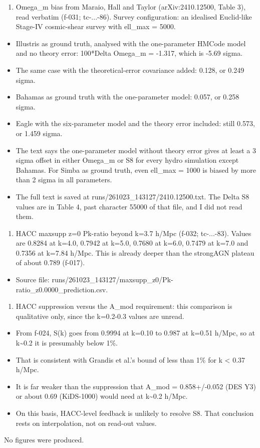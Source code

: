\documentclass[11pt,a4paper]{article}
\begin{document}
\begin{enumerate}
  \item Omega\_m bias from Maraio, Hall and Taylor (arXiv:2410.12500, Table 3), read verbatim (f-031; tc-...-86). Survey configuration: an idealised Euclid-like Stage-IV cosmic-shear survey with ell\_max = 5000.
\end{enumerate}
\begin{itemize}
  \item Illustris as ground truth, analysed with the one-parameter HMCode model and no theory error: 100*Delta Omega\_m = -1.317, which is -5.69 sigma.
  \item The same case with the theoretical-error covariance added: 0.128, or 0.249 sigma.
  \item Bahamas as ground truth with the one-parameter model: 0.057, or 0.258 sigma.
  \item Eagle with the six-parameter model and the theory error included: still 0.573, or 1.459 sigma.
  \item The text says the one-parameter model without theory error gives at least a 3 sigma offset in either Omega\_m or S8 for every hydro simulation except Bahamas. For Simba as ground truth, even ell\_max = 1000 is biased by more than 2 sigma in all parameters.
  \item The full text is saved at runs/261023\_143127/2410.12500.txt. The Delta S8 values are in Table 4, past character 55000 of that file, and I did not read them.
\end{itemize}
\begin{enumerate}
  \item HACC maxsupp z=0 Pk-ratio beyond k=3.7 h/Mpc (f-032; tc-...-83). Values are 0.8284 at k=4.0, 0.7942 at k=5.0, 0.7680 at k=6.0, 0.7479 at k=7.0 and 0.7356 at k=7.84 h/Mpc. This is already deeper than the strongAGN plateau of about 0.789 (f-017).
\end{enumerate}
\begin{itemize}
  \item Source file: runs/261023\_143127/maxsupp\_z0/Pk-ratio\_z0.0000\_prediction.csv.
\end{itemize}
\begin{enumerate}
  \item HACC suppression versus the A\_mod requirement: this comparison is qualitative only, since the k=0.2-0.3 values are unread.
\end{enumerate}
\begin{itemize}
  \item From f-024, S(k) goes from 0.9994 at k=0.10 to 0.987 at k=0.51 h/Mpc, so at k\textasciitilde{}0.2 it is presumably below 1\%.
  \item That is consistent with Grandis et al.'s bound of less than 1\% for k \textless{} 0.37 h/Mpc.
  \item It is far weaker than the suppression that A\_mod = 0.858+/-0.052 (DES Y3) or about 0.69 (KiDS-1000) would need at k\textasciitilde{}0.2 h/Mpc.
  \item On this basis, HACC-level feedback is unlikely to resolve S8. That conclusion rests on interpolation, not on read-out values.
\end{itemize}
No figures were produced.
\end{document}
